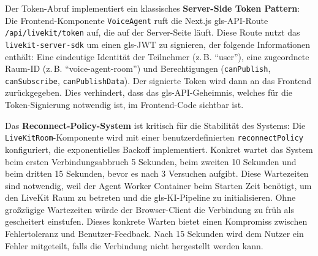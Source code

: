 Der Token-Abruf implementiert ein klassisches \textbf{Server-Side Token Pattern}: Die Frontend-Komponente \texttt{VoiceAgent} ruft die Next.js \gls{gls-API}-Route \texttt{/api/livekit/token} auf, die auf der Server-Seite läuft. Diese Route nutzt das \texttt{livekit-server-sdk} um einen \gls{gls-JWT} zu signieren, der folgende Informationen enthält: Eine eindeutige Identität der Teilnehmer (z.\,B. ``user''), eine zugeordnete Raum-ID (z.\,B. ``voice-agent-room'') und Berechtigungen (\texttt{canPublish}, \texttt{canSubscribe}, \texttt{canPublishData}). Der signierte Token wird dann an das Frontend zurückgegeben. Dies verhindert, dass das \gls{gls-API}-Geheimnis, welches für die Token-Signierung notwendig ist, im Frontend-Code sichtbar ist.

Das \textbf{Reconnect-Policy-System} ist kritisch für die Stabilität des Systems: Die \texttt{LiveKitRoom}-Komponente wird mit einer benutzerdefinierten \texttt{reconnectPolicy} konfiguriert, die exponentielles Backoff implementiert. Konkret wartet das System beim ersten Verbindungsabbruch 5 Sekunden, beim zweiten 10 Sekunden und beim dritten 15 Sekunden, bevor es nach 3 Versuchen aufgibt. Diese Wartezeiten sind notwendig, weil der Agent Worker Container beim Starten Zeit benötigt, um den LiveKit Raum zu betreten und die \gls{gls-KI}-Pipeline zu initialisieren. Ohne gro\ss zügige Wartezeiten würde der Browser-Client die Verbindung zu früh als gescheitert einstufen. Dieses konkrete Warten bietet einen Kompromiss zwischen Fehlertoleranz und Benutzer-Feedback. Nach 15 Sekunden wird dem Nutzer ein Fehler mitgeteilt, falls die Verbindung nicht hergestellt werden kann.

